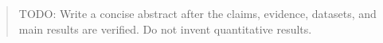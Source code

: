 \begin{abstract}
TODO: Write a concise abstract after the claims, evidence, datasets, and main results are verified. Do not invent quantitative results.
\end{abstract}
